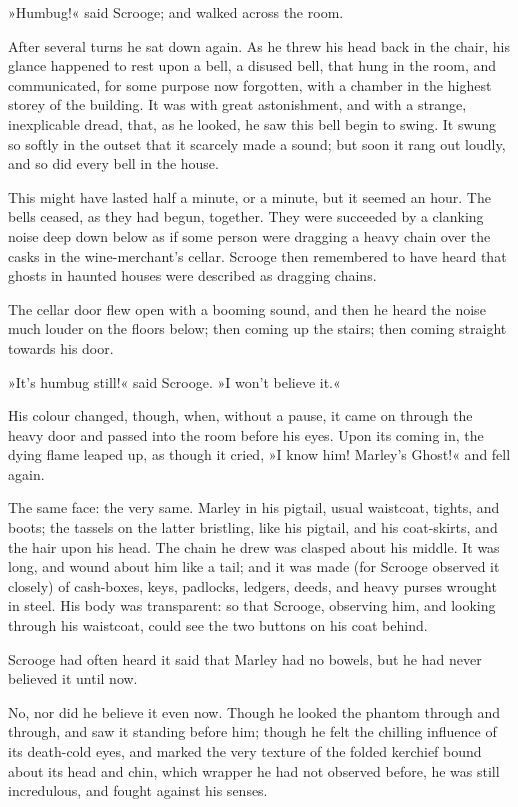 »Humbug!« said Scrooge; and walked across the room.

After several turns he sat down again. As he threw his head back in the chair, his glance happened to rest upon a bell, a disused bell, that hung in the room, and communicated, for some purpose now forgotten, with a chamber in the highest storey of the building. It was with great astonishment, and with a strange, inexplicable dread, that, as he looked, he saw this bell begin to swing. It swung so softly in the outset that it scarcely made a sound; but soon it rang out loudly, and so did every bell in the house.

This might have lasted half a minute, or a minute, but it seemed an hour. The bells ceased, as they had begun, together. They were succeeded by a clanking noise deep down below as if some person were dragging a heavy chain over the casks in the wine-merchant's cellar. Scrooge then remembered to have heard that ghosts in haunted houses were described as dragging chains.

The cellar door flew open with a booming sound, and then he heard the noise much louder on the floors below; then coming up the stairs; then coming straight towards his door.

»It's humbug still!« said Scrooge. »I won't believe it.«

His colour changed, though, when, without a pause, it came on through the heavy door and passed into the room before his eyes. Upon its coming in, the dying flame leaped up, as though it cried, »I know him! Marley's Ghost!« and fell again.

The same face: the very same. Marley in his pigtail, usual waistcoat, tights, and boots; the tassels on the latter bristling, like his pigtail, and his coat-skirts, and the hair upon his head. The chain he drew was clasped about his middle. It was long, and wound about him like a tail; and it was made (for Scrooge observed it closely) of cash-boxes, keys, padlocks, ledgers, deeds, and heavy purses wrought in steel. His body was transparent: so that Scrooge, observing him, and looking through his waistcoat, could see the two buttons on his coat behind.

Scrooge had often heard it said that Marley had no bowels, but he had never believed it until now.

No, nor did he believe it even now. Though he looked the phantom through and through, and saw it standing before him; though he felt the chilling influence of its death-cold eyes, and marked the very texture of the folded kerchief bound about its head and chin, which wrapper he had not observed before, he was still incredulous, and fought against his senses.

